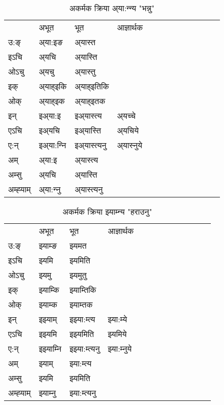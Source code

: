 \begin{table}[H]
\label{ɛt.vi} \centering
\caption{अकर्मक क्रिया  अ्या:न्‍न्य  "भन्नु"  }
\begin{tabular}{l|l|l|l|l|l|l|l|l|l|l|l|l}  \toprule
&अभूत & भूत & आज्ञार्थक \\ 
उ:ङ्‌ &अ्या:इङ &अ्यास्त \\ 
इऽचि &अ्यचि &अ्यास्ति   \\ 
ओऽचु &अ्यचु &अ्यास्तु   \\ 
इक् &अ्याह्इकि &अ्याह्इतिकि   \\ 
ओक् &अ्याह्इक &अ्याह्इतक   \\ 
इन् & इअ्या:इ & इअ्यास्त्य &अ्यच्‍चे  \\ 
एऽचि & इअ्यचि & इअ्यास्ति &अ्यचिये    \\ 
ए:न् & इअ्या:न्‍नि  & इअ्यास्त्यनु &अ्यास्‍नुये  \\ 
अम् & अ्या:इ & अ्यास्त्य   \\ 
अम्सु & अ्यचि & अ्यास्ति   \\ 
अम्ह्‍याम् & अ्या:न्‍नु  & अ्यास्त्यनु \\ 
\bottomrule
\end{tabular}
\end{table}


\begin{table}[H]
\label{ɛm.vi} \centering
\caption{अकर्मक क्रिया  झ्याम्‍न्य  "हराउनु"  }
\begin{tabular}{l|l|l|l|l|l|l|l|l|l|l|l|l}  \toprule
&अभूत & भूत & आज्ञार्थक \\ 
उ:ङ्‌ &झ्याम्ङ &झ्यमत \\ 
इऽचि &झ्यमि &झ्यमिति   \\ 
ओऽचु &झ्यमु &झ्यमुतु   \\ 
इक् &झ्याम्कि &झ्याम्तिकि   \\ 
ओक् &झ्याम्क &झ्याम्तक   \\ 
इन् & इझ्याम् & इझ्या:म्त्य &झ्या:म्ये  \\ 
एऽचि & इझ्यमि & इझ्यमिति &झ्यमिये    \\ 
ए:न् & इझ्याम्‍नि  & इझ्या:म्त्यनु &झ्या:म्‍नुये  \\ 
अम् & झ्याम् & झ्या:म्त्य   \\ 
अम्सु & झ्यमि & झ्यमिति   \\ 
अम्ह्‍याम् & झ्याम्‍नु  & झ्या:म्त्यनु \\ 
\bottomrule
\end{tabular}
\end{table}


